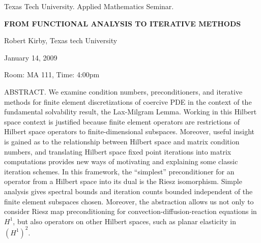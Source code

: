 \documentclass[oneside]{amsart}
\begin{document}
\begin{center}
Texas Tech University. Applied Mathematics Seminar.

\end{center}

\begin{center}

{\LARGE \uppercase{\textbf{
From functional analysis to iterative methods
}}}

Robert Kirby, Texas tech University

January 14, 2009

Room: MA 111, Time: 4:00pm

\end{center}

ABSTRACT. We examine condition numbers, preconditioners, and iterative methods
for finite element discretizations of coercive PDE in the context of
the fundamental solvability result, the Lax-Milgram Lemma.  Working in
this Hilbert space context is justified because finite element
operators are restrictions of Hilbert space operators to
finite-dimensional subspaces.  Moreover, useful insight is gained as
to the relationship between Hilbert space and matrix condition
numbers, and translating Hilbert space fixed point iterations into
matrix computations provides new ways of motivating and explaining
some classic iteration schemes.  In this framework, the ``simplest''
preconditioner for an operator from a Hilbert space into its dual is
the Riesz isomorphism.  Simple analysis gives spectral bounds and
iteration counts bounded independent of the finite element subspaces
chosen.  Moreover, the abstraction allows us not only to consider
Riesz map preconditioning for convection-diffusion-reaction equations
in $H^1$, but also operators on other Hilbert spaces, such as planar
elasticity in $\left(H^1\right)^2$.
\end{document}
